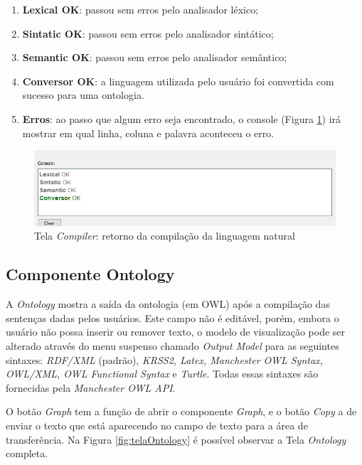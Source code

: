 \documentclass{bcc}
\begin{document}
\begin{enumerate}
  \item \textbf{Lexical OK}: passou sem erros pelo analisador léxico;
  \item \textbf{Sintatic OK}: passou sem erros pelo analisador sintático;
  \item \textbf{Semantic OK}: passou sem erros pelo analisador semântico;
  \item \textbf{Conversor OK}: a linguagem utilizada pelo usuário foi convertida com sucesso para uma ontologia.
  \item \textbf{Erros}: ao passo que algum erro seja encontrado, o console (Figura \ref{fig:telaCompiler2}) irá mostrar em qual linha, coluna e palavra aconteceu o erro.
\end{enumerate}

\begin{figure}[H]
\centering
\includegraphics[width=.8\textwidth]{Figuras/tela_compiler2.png}
\caption{Tela \textit{Compiler}: retorno da compilação da linguagem natural}
\label{fig:telaCompiler2}
\end{figure}

\subsection{Componente Ontology}

A \textit{Ontology} mostra a saída da ontologia (em OWL) após a compilação das sentenças dadas pelos usuários. Este campo não é editável, porém, embora o usuário não possa inserir ou remover texto, o modelo de visualização pode ser alterado através do menu suspenso chamado \textit{Output Model} para as seguintes sintaxes: \textit{RDF/XML} (padrão), \textit{KRSS2, Latex, Manchester OWL Syntax, OWL/XML, OWL Functional Syntax} e \textit{Turtle}. Todas essas sintaxes são fornecidas pela \textit{Manchester OWL API}. 

O botão \textit{Graph} tem a função de abrir o componente \textit{Graph}, e o botão \textit{Copy} a de enviar o texto que está aparecendo no campo de texto para a área de transferência. Na Figura \ref{fig:telaOntology} é possível observar a Tela \textit{Ontology} completa.
\end{document}
